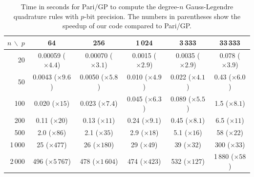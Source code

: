 \documentclass[nohypdvips,review]{siamart0216}
\begin{document}

\begin{table}[t!]
\caption{Time in seconds for Pari/GP to compute the degree-$n$ Gauss-Legendre quadrature rules with $p$-bit precision. The
numbers in parentheses show the speedup of our code compared to Pari/GP.}
\label{tab:parispeedup}
\begin{center}
\setlength{\tabcolsep}{1ex}
\begin{tabular}{ r | c c c c c }
$n\, \backslash \; p$ & 64 & 256 & 1\,024 & 3\,333 & 33\,333 \\ \hline\rule{0pt}{3ex}
20      & 0.00059 (\footnotesize{$\times 4.4$)}  &  0.00070 (\footnotesize{$\times 3.1$)}  &  0.0015 (\footnotesize{$\times 2.9$)}  &  0.0035 (\footnotesize{$\times 2.9$)}  &  0.078 (\footnotesize{$\times 3.9$)}  \\
50      & 0.0043 (\footnotesize{$\times 9.6$)}  &  0.0050 (\footnotesize{$\times 5.8$)} &  0.010 (\footnotesize{$\times 4.9$)}  &  0.022 (\footnotesize{$\times 4.1$)} &  0.43 (\footnotesize{$\times 6.0$)}  \\
100     &  0.020 (\footnotesize{$\times 15$)}   &   0.023 (\footnotesize{$\times 7.4$)}  &   0.045 (\footnotesize{$\times 6.3$)}  &  0.089 (\footnotesize{$\times 5.5$)} &  1.5 (\footnotesize{$\times 8.1$)}  \\
200     &  0.11 (\footnotesize{$\times 20$)}   &  0.13 (\footnotesize{$\times 11$)}  &  0.24 (\footnotesize{$\times 9.1$)}  &  0.45 (\footnotesize{$\times 8.1$)}  &  6.5 (\footnotesize{$\times 11$)}  \\
500     &  2.0 (\footnotesize{$\times 86$)}     & 2.1 (\footnotesize{$\times 35$)}  &  2.9 (\footnotesize{$\times 18$)}  &  5.1 (\footnotesize{$\times 16$)}  &  58 (\footnotesize{$\times 22$)}  \\
1\,000  & 25 (\footnotesize{$\times 477$)}    &  26 (\footnotesize{$\times 180$)} &  29 (\footnotesize{$\times 49$)}  &  39 (\footnotesize{$\times 32$)}  & 300 (\footnotesize{$\times 33$)} \\
2\,000  &  496 (\footnotesize{$\times 5\,767$)}   & 478 (\footnotesize{$\times 1\,604$)}  &  474 (\footnotesize{$\times 423$)}  &  532 (\footnotesize{$\times 127$)}  &  1\,880 (\footnotesize{$\times 58$)}  \\
\end{tabular}
\end{center}
\end{table}
\end{document}
